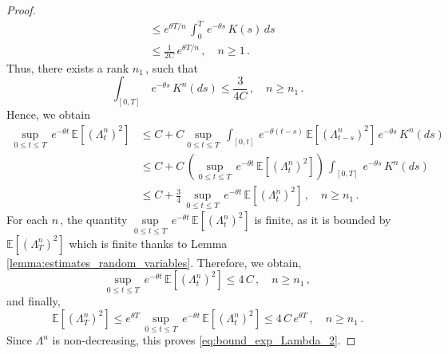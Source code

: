 \documentclass[10pt,a4paper]{amsart}
\begin{document}
\begin{proof}
\begin{align*}
        &\leq e^{\theta T / n}\, \int_0^T\,e^{- \theta s}\,K(s)\,ds\\
        & \leq \frac{1}{2C}\,e^{\theta T / n}\,, \quad n \geq 1\,.
    \end{align*}
    Thus, there exists a rank $n_1\,$, such that
    $$
    \int_{[0,T]}\,e^{- \theta s}\,K^n(ds) \leq \frac{3}{4C}\,, \quad n \geq n_1\,.
    $$
    Hence, we obtain
    \begin{align*}
        \sup_{0 \leq t \leq T}\, e^{- \theta t}\, \mathbb E \left[\left(\Lambda^n_t\right)^2 \right] &\leq C + C \sup_{0 \leq t \leq T}\, \int_{[0,t]}\,e^{- \theta(t-s)}\, \mathbb E \left[\left(\Lambda^n_{t-s}\right)^2\right]\,e^{- \theta s}\,K^n(ds) \\
        &\leq C + C\,\left(\sup_{0 \leq t \leq T}\,e^{- \theta t}\, \mathbb E \left[\left(\Lambda^n_{t} \right)^2\right] \right)\,\int_{[0,T]}\,e^{- \theta s}\,K^n(ds) \\
        &\leq C + \frac{3}{4}\, \sup_{0 \leq t \leq T}\,e^{- \theta t}\, \mathbb E \left[\left(\Lambda^n_{t} \right)^2\right]\,, \quad n \geq n_1\,.
    \end{align*}
    For each $n\,$, the quantity $\sup\limits_{0 \leq t \leq T}\,e^{- \theta t}\, \mathbb E \left[ \left(\Lambda^n_t\right)^2\right]$ is finite, as it is bounded by $\mathbb E \left[\left(\Lambda^n_T \right)^2 \right]$ which is finite thanks to Lemma \ref{lemma:estimates_random_variables}. Therefore, we obtain,
    $$
    \sup_{0 \leq t \leq T}\,e^{- \theta t}\,\mathbb E \left[\left(\Lambda^n_t \right)^2\right] \leq 4\,C\,, \quad n \geq n_1\,,
    $$
    and finally,
    $$
    \mathbb E \left[(\Lambda^n_T)^2 \right] \leq e^{\theta T}\,\sup_{0 \leq t \leq T}\,e^{-\theta t}\, \mathbb E \left[ \left(\Lambda^n_t\right)^2\right] \leq 4\,C\,e^{\theta T}\,, \quad n \geq n_1\,.
    $$
    Since $\Lambda^n$ is non-decreasing, this proves \eqref{eq:bound_exp_Lambda_2}.
    
    
    


\end{proof}
\end{document}
